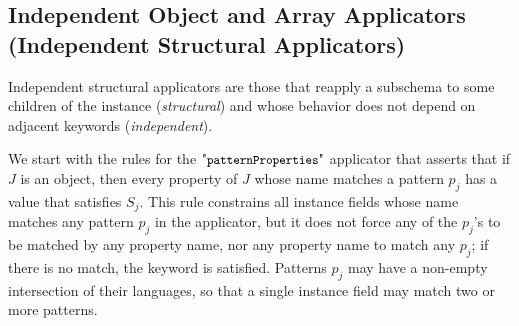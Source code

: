 

\subsection{Independent Object and Array Applicators (Independent Structural Applicators)}\label{sec:structural}



Independent structural applicators are those that reapply a subschema to some children of the instance
(\emph{structural})
and whose behavior does not depend on adjacent keywords (\emph{independent}).

We start with the rules for the $\apattProps$ applicator that asserts that
if $J$ is an object, then every property of $J$ whose name matches a pattern $p_j$ has a value that satisfies $S_j$.
This rule constrains all instance fields whose name matches any pattern $p_j$ in the applicator, but it does not
force any of the $p_j$'s to be matched by any property name, nor any property name to match any $p_j$;
if there is no match, the keyword is satisfied. Patterns $p_j$ may have a non-empty intersection of their languages,
so that a single instance field may match two or more patterns.

